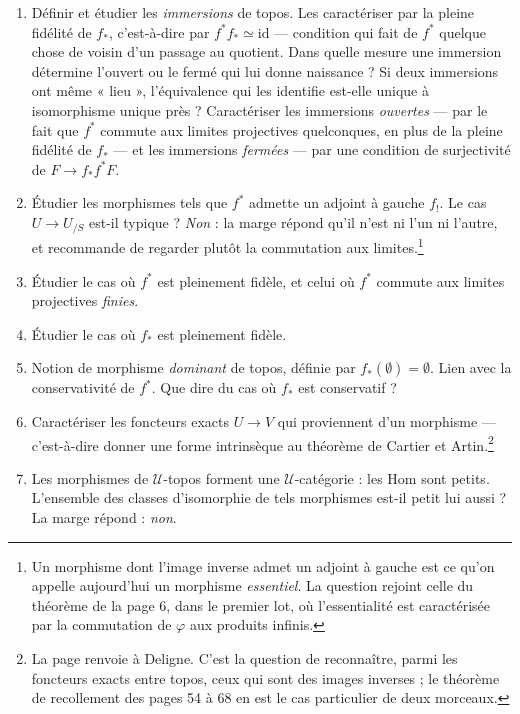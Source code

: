\documentclass[11pt,a4paper]{article}
\begin{document}
\begin{enumerate}
\item[1)] Définir et étudier les \emph{immersions} de topos. Les caractériser
par la pleine fidélité de $f_{*}$, c'est-à-dire par
$f^{*}f_{*} \simeq \mathrm{id}$ — condition qui fait de $f^{*}$ quelque chose
de voisin d'un passage au quotient. Dans quelle mesure une immersion détermine
l'ouvert ou le fermé qui lui donne naissance ? Si deux immersions ont même
« lieu », l'équivalence qui les identifie est-elle unique à isomorphisme unique
près ? Caractériser les immersions \emph{ouvertes} — par le fait que $f^{*}$
commute aux limites projectives quelconques, en plus de la pleine fidélité de
$f_{*}$ — et les immersions \emph{fermées} — par une condition de
surjectivité de $F \to f_{*}f^{*}F$.

\item[2)] Étudier les morphismes tels que $f^{*}$ admette un adjoint à gauche
$f_{!}$. Le cas $U \to U_{/S}$ est-il typique ? \emph{Non} : la marge répond
qu'il n'est ni l'un ni l'autre, et recommande de regarder plutôt la commutation
aux limites.\footnote{Un morphisme dont l'image inverse admet un adjoint à
gauche est ce qu'on appelle aujourd'hui un morphisme \emph{essentiel}. La
question rejoint celle du théorème de la page 6, dans le premier lot, où
l'essentialité est caractérisée par la commutation de $\varphi$ aux produits
infinis.}

\item[3)] Étudier le cas où $f^{*}$ est pleinement fidèle, et celui où $f^{*}$
commute aux limites projectives \emph{finies}.

\item[4)] Étudier le cas où $f_{*}$ est pleinement fidèle.

\item[5)] Notion de morphisme \emph{dominant} de topos, définie par
$f_{*}(\emptyset) = \emptyset$. Lien avec la conservativité de $f^{*}$. Que
dire du cas où $f_{*}$ est conservatif ?

\item[6)] Caractériser les foncteurs exacts $U \to V$ qui proviennent d'un
morphisme — c'est-à-dire donner une forme intrinsèque au théorème de Cartier et
Artin.\footnote{La page renvoie à Deligne. C'est la question de reconnaître,
parmi les foncteurs exacts entre topos, ceux qui sont des images inverses ; le
théorème de recollement des pages 54 à 68 en est le cas particulier de deux
morceaux.}

\item[7)] Les morphismes de $\mathcal{U}$-topos forment une
$\mathcal{U}$-catégorie : les $\mathrm{Hom}$ sont petits. L'ensemble des
classes d'isomorphie de tels morphismes est-il petit lui aussi ? La marge
répond : \emph{non}.


\end{enumerate}
\end{document}
